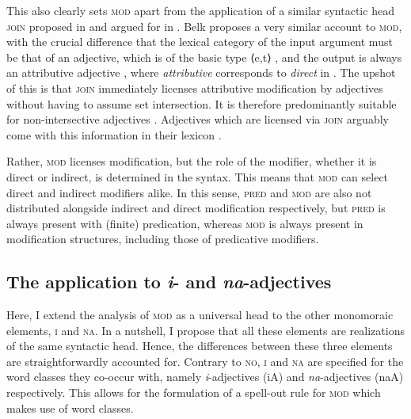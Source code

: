 This also clearly sets \textsc{mod} apart from the application of a similar syntactic head \textsc{join} proposed in \citet{truswell:2004:attributive, truswell:2009:attributive} and argued for in \citet{belk:2017:attributes}. Belk proposes a very similar account to \textsc{mod}, with the crucial difference that the lexical category of the input argument must be that of an adjective, which is of the basic type ⟨e,t⟩ \citep{partee:1986:noun}, and the output is always an attributive adjective \citep[§ 2.3]{belk:2017:attributes}, where \textit{attributive} corresponds to \textit{direct} in \citet{cinque:2010:adj}. The upshot of this is that \textsc{join} immediately licenses attributive modification by adjectives without having to assume set intersection. It is therefore predominantly suitable for non-intersective adjectives \citep[37–38]{truswell:2004:attributive}. Adjectives which are licensed via \textsc{join} arguably come with this information in their lexicon \citep[157]{belk:2017:attributes}.

Rather, \textsc{mod} licenses modification, but the role of the modifier, whether it is direct or indirect, is determined in the syntax. This means that \textsc{mod} can select direct and indirect modifiers alike. In this sense, \textsc{pred} and \textsc{mod} are also not distributed alongside indirect and direct modification respectively, but \textsc{pred} is always present with (finite) predication, whereas \textsc{mod} is always present in modification structures, including those of predicative modifiers.

\subsection{The application to \textit{i}- and \textit{na}-adjectives} \label{appl adj}

Here, I extend the analysis of \textsc{mod} as a universal head to the other monomoraic elements, \textsc{i} and \textsc{na}. In a nutshell, I propose that all these elements are realizations of the same syntactic head. Hence, the differences between these three elements are straightforwardly accounted for. Contrary to \textsc{no}, \textsc{i} and \textsc{na} are specified for the word classes they co-occur with, namely \textit{i}-adjectives (iA) and \textit{na}-adjectives (naA) respectively. This allows for the formulation of a spell-out rule for \textsc{mod} which makes use of word classes.

